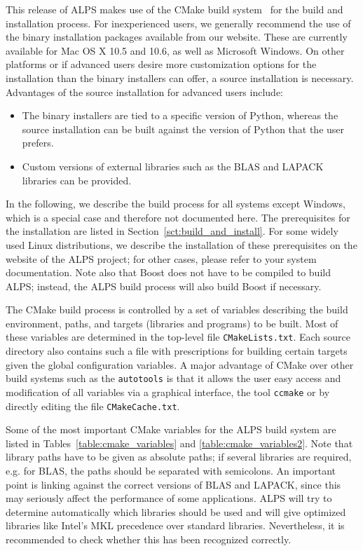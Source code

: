\documentclass[12pt]{iopart}
\begin{document}
This release of ALPS makes use of the CMake build system~\cite{cmake} for the build and installation process. For inexperienced users, we generally recommend the use of the binary installation packages available from our website. These are currently available for Mac OS X 10.5 and 10.6, as well as Microsoft Windows. On other platforms or if advanced users desire more customization options for the installation than the binary installers can offer, a source installation is necessary. Advantages of the source installation for advanced users include:
\begin{itemize}
\item The binary installers are tied to a specific version of Python, whereas the source installation can be built against the version of Python that the user prefers.
\item Custom versions of external libraries such as the BLAS and LAPACK libraries can be provided.
\end{itemize}

In the following, we describe the build process for all systems except Windows, which is a special case and therefore not documented here. The prerequisites for the installation are listed in Section~\ref{sct:build_and_install}. For some widely used Linux distributions, we describe the installation of these prerequisites on the website of the ALPS project; for other cases, please refer to your system documentation. Note also that Boost does not have to be compiled to build ALPS; instead, the ALPS build process will also build Boost if necessary.

The CMake build process is controlled by a set of variables describing the build environment, paths, and targets (libraries and programs) to be built. Most of these variables are determined in the top-level file {\tt CMakeLists.txt}. Each source directory also contains such a file with prescriptions for building certain targets given the global configuration variables. A major advantage of CMake over other build systems such as the {\tt autotools} is that it allows the user easy access and modification of all variables via a graphical interface, the tool {\tt ccmake} or by directly editing the file {\tt CMakeCache.txt}.

Some of the most important CMake variables for the ALPS build system are listed in Tables~\ref{table:cmake_variables} and \ref{table:cmake_variables2}. Note that library paths have to be given as absolute paths; if several libraries are required, e.g. for BLAS, the paths should be separated with semicolons. An important point is linking against the correct versions of BLAS and LAPACK, since this may seriously affect the performance of some applications. ALPS will try to determine automatically which libraries should be used and will give optimized libraries like Intel's MKL precedence over standard libraries. Nevertheless, it is recommended to check whether this has been recognized correctly.
\end{document}
